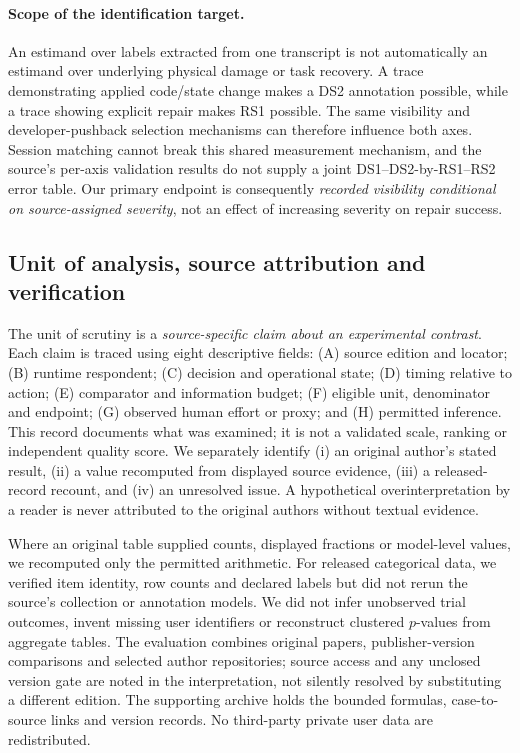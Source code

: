 \paragraph{Scope of the identification target.} An estimand over labels extracted from one transcript is not automatically an estimand over underlying physical damage or task recovery. A trace demonstrating applied code/state change makes a DS2 annotation possible, while a trace showing explicit repair makes RS1 possible. The same visibility and developer-pushback selection mechanisms can therefore influence both axes. Session matching cannot break this shared measurement mechanism, and the source's per-axis validation results do not supply a joint DS1--DS2-by-RS1--RS2 error table. Our primary endpoint is consequently \emph{recorded visibility conditional on source-assigned severity}, not an effect of increasing severity on repair success.

\subsection{Unit of analysis, source attribution and verification}
The unit of scrutiny is a \emph{source-specific claim about an experimental contrast}. Each claim is traced using eight descriptive fields: (A) source edition and locator; (B) runtime respondent; (C) decision and operational state; (D) timing relative to action; (E) comparator and information budget; (F) eligible unit, denominator and endpoint; (G) observed human effort or proxy; and (H) permitted inference. This record documents what was examined; it is not a validated scale, ranking or independent quality score. We separately identify (i) an original author's stated result, (ii) a value recomputed from displayed source evidence, (iii) a released-record recount, and (iv) an unresolved issue. A hypothetical overinterpretation by a reader is never attributed to the original authors without textual evidence.

Where an original table supplied counts, displayed fractions or model-level values, we recomputed only the permitted arithmetic. For released categorical data, we verified item identity, row counts and declared labels but did not rerun the source's collection or annotation models. We did not infer unobserved trial outcomes, invent missing user identifiers or reconstruct clustered $p$-values from aggregate tables. The evaluation combines original papers, publisher-version comparisons and selected author repositories; source access and any unclosed version gate are noted in the interpretation, not silently resolved by substituting a different edition. The supporting archive holds the bounded formulas, case-to-source links and version records. No third-party private user data are redistributed.

